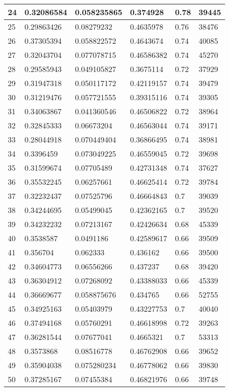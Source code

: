 \begin{longtable}{|l|l|l|l|l|l|}
24 & 0.32086584 & 0.058235865 & 0.374928 & 0.78 & 39445 \\ \hline 
25 & 0.29863426 & 0.08279232 & 0.4635978 & 0.76 & 38476 \\ \hline 
26 & 0.37305394 & 0.058822572 & 0.4643674 & 0.74 & 40085 \\ \hline 
27 & 0.32043704 & 0.077078715 & 0.46586382 & 0.74 & 45270 \\ \hline 
28 & 0.29585943 & 0.049105827 & 0.3675114 & 0.72 & 37929 \\ \hline 
29 & 0.31947318 & 0.050117172 & 0.42119157 & 0.74 & 39479 \\ \hline 
30 & 0.31219476 & 0.057721555 & 0.39315116 & 0.74 & 39305 \\ \hline 
31 & 0.34063867 & 0.041360546 & 0.46506822 & 0.72 & 38964 \\ \hline 
32 & 0.32845333 & 0.06673204 & 0.46563044 & 0.74 & 39171 \\ \hline 
33 & 0.28044918 & 0.070449404 & 0.36866495 & 0.74 & 38981 \\ \hline 
34 & 0.3396459 & 0.073049225 & 0.46559045 & 0.72 & 39698 \\ \hline 
35 & 0.31599674 & 0.07705489 & 0.42731348 & 0.74 & 37627 \\ \hline 
36 & 0.35532245 & 0.06257661 & 0.46625414 & 0.72 & 39784 \\ \hline 
37 & 0.32232437 & 0.07525796 & 0.46664843 & 0.7 & 39039 \\ \hline 
38 & 0.34244695 & 0.05499045 & 0.42362165 & 0.7 & 39520 \\ \hline 
39 & 0.34232232 & 0.07213167 & 0.42426634 & 0.68 & 45339 \\ \hline 
40 & 0.3538587 & 0.0491186 & 0.42589617 & 0.66 & 39509 \\ \hline 
41 & 0.356704 & 0.062333 & 0.436162 & 0.66 & 39500 \\ \hline 
42 & 0.34604773 & 0.06556266 & 0.437237 & 0.68 & 39420 \\ \hline 
43 & 0.36304912 & 0.07268092 & 0.43388033 & 0.66 & 45339 \\ \hline 
44 & 0.36669677 & 0.058875676 & 0.434765 & 0.66 & 52755 \\ \hline 
45 & 0.34925163 & 0.05403979 & 0.43227753 & 0.7 & 40040 \\ \hline 
46 & 0.37494168 & 0.05760291 & 0.46618998 & 0.72 & 39263 \\ \hline 
47 & 0.36281544 & 0.07677041 & 0.4665321 & 0.7 & 53313 \\ \hline 
48 & 0.3573868 & 0.08516778 & 0.46762908 & 0.66 & 39652 \\ \hline 
49 & 0.35904038 & 0.075280234 & 0.46778062 & 0.66 & 39830 \\ \hline 
50 & 0.37285167 & 0.07455384 & 0.46821976 & 0.66 & 39748 \\ \hline 
\end{longtable}
